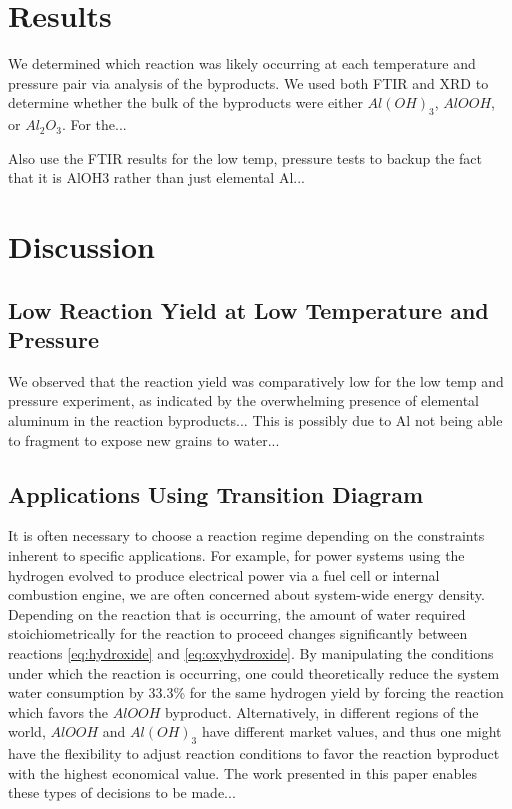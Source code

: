 \documentclass[preprint,12pt,3p]{elsarticle}
\begin{document}
\section{Results}
\label{results}

We determined which reaction was likely occurring at each temperature and
pressure pair via analysis of the byproducts. We used both FTIR and XRD to
determine whether the bulk of the byproducts were either $Al(OH)_3$, $AlOOH$, or
$Al_2O_3$. For the...

Also use the FTIR results for the low temp, pressure tests to backup the fact
that it is AlOH3 rather than just elemental Al...

\section{Discussion}
\label{discussion}

\subsection{Low Reaction Yield at Low Temperature and Pressure}

We observed that the reaction yield was comparatively low for the low temp and
pressure experiment, as indicated by the overwhelming presence of elemental
aluminum in the reaction byproducts... This is possibly due to Al not being able
to fragment to expose new grains to water...
 
\subsection{Applications Using Transition Diagram}

It is often necessary to choose a reaction regime depending on the constraints
inherent to specific applications. For example, for power systems using the
hydrogen evolved to produce electrical power via a fuel cell or internal
combustion engine, we are often concerned about system-wide energy density.
Depending on the reaction that is occurring, the amount of water required
stoichiometrically for the reaction to proceed changes significantly between
reactions \ref{eq:hydroxide} and \ref{eq:oxyhydroxide}. By manipulating the
conditions under which the reaction is occurring, one could theoretically reduce
the system water consumption by 33.3\% for the same hydrogen yield by forcing
the reaction which favors the $AlOOH$ byproduct. Alternatively, in different
regions of the world, $AlOOH$ and $Al(OH)_3$ have different market values, and
thus one might have the flexibility to adjust reaction conditions to favor the
reaction byproduct with the highest economical value. The work presented in this
paper enables these types of decisions to be made...
\end{document}
